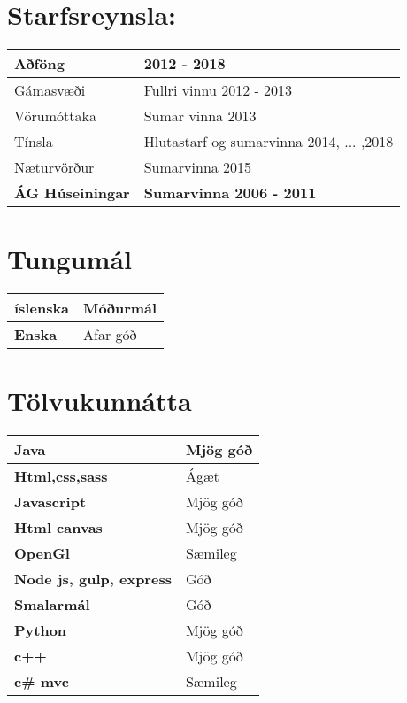 \documentclass[]{article}
\begin{document}
\section*{Starfsreynsla:}
\begin{table}[h]
	\centering
	\label{my-label}
	\begin{tabular}{|p{7cm}|p{10cm}|}
		\hline
			\textbf{Aðföng} & \textbf{2012 - 2018} 
		\\ \hline
			Gámasvæði &
			Fullri vinnu 2012 - 2013
		\\ \hline
			Vörumóttaka &
			Sumar vinna 2013
		\\ \hline
			Tínsla &
			Hlutastarf og sumarvinna 2014, ... ,2018
		\\ \hline
			Næturvörður &
			Sumarvinna 2015
		\\ \hline
			\textbf{ÁG Húseiningar} &
			\textbf{Sumarvinna 2006 - 2011}
		\\ \hline
	\end{tabular}
\end{table}

\pagebreak

\section*{Tungumál}
\begin{table}[h]
	\centering
	\label{my-label}
	\begin{tabular}{|p{7cm}|p{10cm}|}
		\hline
			\textbf{íslenska} &
			Móðurmál
		\\ \hline
			\textbf{Enska} &
			Afar góð
		\\ \hline
	\end{tabular}
\end{table}

\section*{Tölvukunnátta}

\begin{table}[h]
	\centering
	\label{my-label}
	\begin{tabular}{|p{7cm}|p{10cm}|}
		\hline
			\textbf{Java} &
			Mjög góð
		\\ \hline
			\textbf{Html,css,sass} &
			Ágæt
		\\ \hline
			\textbf{Javascript} &
			Mjög góð
		\\ \hline
			\textbf{Html canvas} &
			Mjög góð
		\\ \hline
			\textbf{OpenGl} &
			Sæmileg
		\\ \hline
			\textbf{Node js, gulp, express} & 
			Góð
		\\ \hline
			\textbf{Smalarmál} &
			Góð
		\\ \hline
			\textbf{Python} &
			Mjög góð
		\\ \hline
			\textbf{c++} &
			Mjög góð
		\\ \hline
			\textbf{c\# mvc} &
			Sæmileg
		\\ \hline
		
		
		
	\end{tabular}
\end{table}
\end{document}
